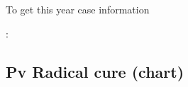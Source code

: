 \documentclass[letterpaper,10pt,english,openany,oneside]{sphinxmanual}
\begin{document}
\begin{fulllineitems}
\label{\detokenize{api-cmi/v1:get--api-malaria-info-v1-Surveillance-case_this_year}}
\sphinxAtStartPar
To get this year case information

\sphinxAtStartPar
{}:

\begin{sphinxVerbatim}[commandchars=\\\{\}]
   
   
   \PYG{p}{[}
           
           
           
           
  \PYG{p}{]}
\end{sphinxVerbatim}

\end{fulllineitems}



\subsection{Pv Radical cure (chart)}
\label{\detokenize{api-cmi/v1:pv-radical-cure-chart}}
\end{document}
